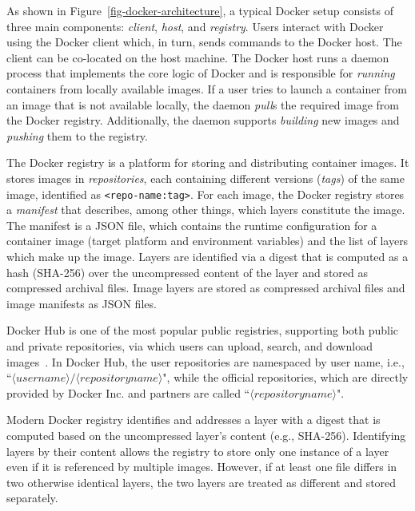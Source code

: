 

As shown in Figure~\ref{fig-docker-architecture}, a typical Docker setup consists of three main components: \emph{client}, \emph{host}, and \emph{registry}.
Users interact with Docker using the Docker client which, in turn, sends commands to the Docker host.
The client can be co-located on the host machine. 
The Docker host runs a daemon process that implements the core logic of Docker and is responsible for \emph{running} containers from locally available images.
If a user tries to launch a container from an image that is not available locally, the daemon \emph{pull}s the required image from the Docker registry.
Additionally, the daemon supports \emph{building} new images and \emph{pushing} them to the registry.

The Docker registry is a platform for storing and distributing container images.
It stores images in \emph{repositories}, each containing different versions (\emph{tags}) of the same image, identified as \texttt{<repo-name:tag>}.
For each image, the Docker registry stores a \emph{manifest} that describes, among other things, which layers constitute the image.
The manifest is a JSON file, which contains the runtime configuration for a container image (\eg target platform and environment variables) 
and the list of layers which make up the image.
Layers are identified via a digest that is computed as a hash (SHA-256) over the uncompressed content of the layer and stored as compressed archival files.
Image layers are stored as compressed archival files and image manifests as JSON files.

Docker Hub is one of the most popular public registries, supporting both public and private repositories, via which users can upload, search, and
download images~\cite{docker-hub}.
In Docker Hub, the user repositories are namespaced by user name, i.e., ``$\langle username\rangle/\langle repository name \rangle$", while the
official repositories, which are directly provided by Docker Inc. and partners are called ``$\langle repository name \rangle$".

Modern Docker registry identifies and addresses a layer with a digest that is computed based on the uncompressed layer's content (e.g., SHA-256).
Identifying layers by their content allows the registry to store only one instance of a layer even if it is referenced by multiple images. 
However, if at least one file differs in two otherwise identical layers, the two layers are treated as different and stored separately.


